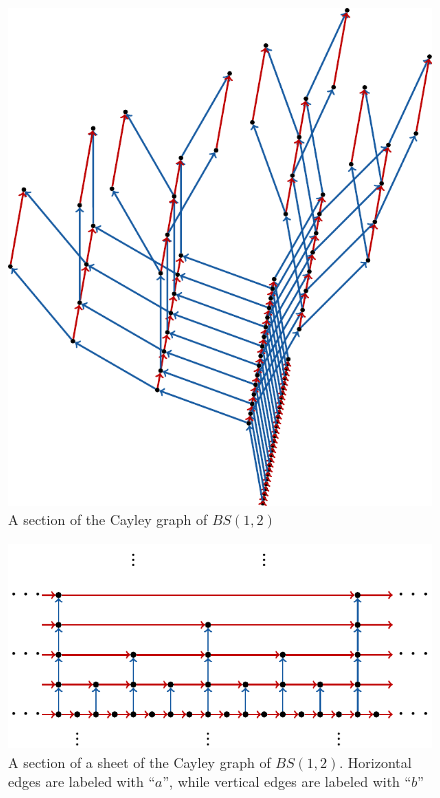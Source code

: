 \documentclass[cupthm,crop,info]{CUP-JNL-ETS}%
\theoremstyle{cupplain}
\theoremstyle{cupdefinition}
\theoremstyle{cupremark}
\theoremstyle{cupproof}
\numberwithin{equation}{section}
\begin{document}
\begin{figure}[h]
	\centering
	\includegraphics[scale=0.8]{bs_section.pdf}
	\caption{A section of the Cayley graph of $BS(1,2)$}
	\label{fig:section_cayley_graph_bs}
\end{figure}
\begin{figure}[h]
	\centering
\includegraphics[scale=0.9]{bs_onesheet.pdf}
	\caption{A section of a sheet of the Cayley graph of $BS(1,2)$.  Horizontal edges are labeled with ``$a$'', while vertical edges are labeled with ``$b$''}
	\label{fig:bssheet}
\end{figure}
\end{document}
